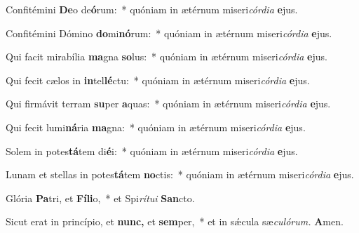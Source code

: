 \item Confitémini \textbf{De}o de\textbf{ó}rum:~* quóniam in ætérnum miseri\hspace{0.03em}\textit{córdia} \textbf{e}jus.
\item Confitémini Dómino \textbf{do}mi\textbf{nó}rum:~* quóniam in ætérnum miseri\hspace{0.03em}\textit{córdia} \textbf{e}jus.
\item Qui facit mirabília \textbf{ma}gna \textbf{so}lus:~* quóniam in ætérnum miseri\hspace{0.03em}\textit{córdia} \textbf{e}jus.
\item Qui fecit cælos in \textbf{in}tel\textbf{lé}ctu:~* quóniam in ætérnum miseri\hspace{0.03em}\textit{córdia} \textbf{e}jus.
\item Qui firmávit terram \textbf{su}per \textbf{a}quas:~* quóniam in ætérnum miseri\hspace{0.03em}\textit{córdia} \textbf{e}jus.
\item Qui fecit lumi\textbf{ná}ria \textbf{ma}gna:~* quóniam in ætérnum miseri\hspace{0.03em}\textit{córdia} \textbf{e}jus.
\item Solem in potes\textbf{tá}tem di\textbf{é}i:~* quóniam in ætérnum miseri\hspace{0.03em}\textit{córdia} \textbf{e}jus.
\item Lunam et stellas in potes\textbf{tá}tem \textbf{no}ctis:~* quóniam in ætérnum miseri\hspace{0.03em}\textit{córdia} \textbf{e}jus.
\item Glória \textbf{Pa}tri, et \textbf{Fí}\textbf{li}o,~* et Spi\hspace{0.03em}\textit{rítui} \textbf{San}cto.
\item Sicut erat in princípio, et \textbf{nunc,} et \textbf{sem}per,~* et in sǽcula sæ\hspace{0.03em}\textit{culórum.} \textbf{A}men.
